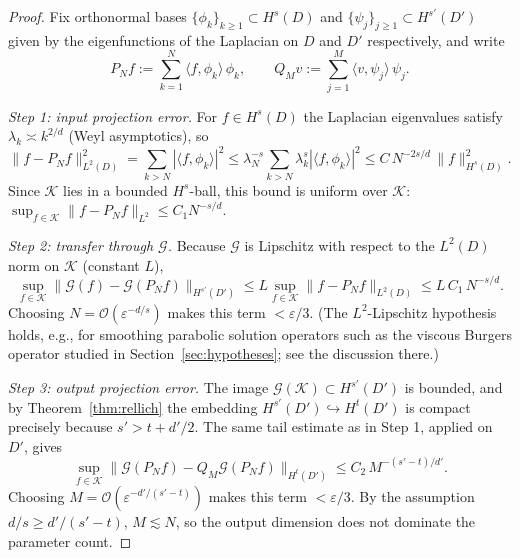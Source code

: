 \documentclass[11pt]{article}
\theoremstyle{plain}
\theoremstyle{definition}
\theoremstyle{remark}
\begin{document}
\begin{proof}
Fix orthonormal bases $\{\phi_k\}_{k\ge1} \subset H^{s}(D)$ and
$\{\psi_j\}_{j\ge1} \subset H^{s'}(D')$ given by the eigenfunctions of the
Laplacian on $D$ and $D'$ respectively, and write
\[
  P_N f := \sum_{k=1}^{N} \langle f,\phi_k\rangle\,\phi_k,
  \qquad
  Q_M v := \sum_{j=1}^{M} \langle v,\psi_j\rangle\,\psi_j .
\]

\emph{Step 1: input projection error.}
For $f \in H^{s}(D)$ the Laplacian eigenvalues satisfy
$\lambda_k \asymp k^{2/d}$ (Weyl asymptotics), so
\[
  \| f - P_N f \|_{L^2(D)}^2
    = \sum_{k>N} |\langle f,\phi_k\rangle|^2
    \le \lambda_N^{-s}\sum_{k>N} \lambda_k^{s}|\langle f,\phi_k\rangle|^2
    \le C\,N^{-2s/d}\,\|f\|_{H^s(D)}^2 .
\]
Since $\mathcal{K}$ lies in a bounded $H^{s}$-ball, this bound is uniform over
$\mathcal{K}$: $\sup_{f\in\mathcal{K}}\|f - P_N f\|_{L^2} \le C_1 N^{-s/d}$.

\emph{Step 2: transfer through $\mathcal{G}$.}
Because $\mathcal{G}$ is Lipschitz with respect to the $L^2(D)$ norm on
$\mathcal{K}$ (constant $L$),
\[
  \sup_{f\in\mathcal{K}}
    \| \mathcal{G}(f) - \mathcal{G}(P_N f) \|_{H^{s'}(D')}
    \le L \sup_{f\in\mathcal{K}} \| f - P_N f \|_{L^2(D)}
    \le L\,C_1\,N^{-s/d}.
\]
Choosing $N = \mathcal{O}(\varepsilon^{-d/s})$ makes this term
$< \varepsilon/3$. (The $L^2$-Lipschitz hypothesis holds, e.g., for smoothing
parabolic solution operators such as the viscous Burgers operator studied in
Section~\ref{sec:hypotheses}; see the discussion there.)

\emph{Step 3: output projection error.}
The image $\mathcal{G}(\mathcal{K}) \subset H^{s'}(D')$ is bounded, and by
Theorem~\ref{thm:rellich} the embedding $H^{s'}(D')\hookrightarrow H^{t}(D')$
is compact precisely because $s' > t + d'/2$. The same tail estimate as in
Step 1, applied on $D'$, gives
\[
  \sup_{f\in\mathcal{K}}
    \| \mathcal{G}(P_N f) - Q_M \mathcal{G}(P_N f) \|_{H^{t}(D')}
    \le C_2\,M^{-(s'-t)/d'} .
\]
Choosing $M = \mathcal{O}(\varepsilon^{-d'/(s'-t)})$ makes this term $< \varepsilon/3$. By the assumption $d/s \ge d'/(s'-t)$, $M \lesssim N$, so the output dimension does not dominate the parameter count.


\end{proof}
\end{document}
